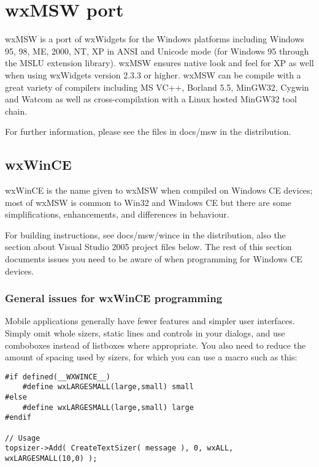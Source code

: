 \section{wxMSW port}\label{wxmswport}

wxMSW is a port of wxWidgets for the Windows platforms
including Windows 95, 98, ME, 2000, NT, XP in ANSI and
Unicode mode (for Windows 95 through the MSLU extension
library). wxMSW ensures native look and feel for XP
as well when using wxWidgets version 2.3.3 or higher.
wxMSW can be compile with a great variety of compilers
including MS VC++, Borland 5.5, MinGW32, Cygwin and
Watcom as well as cross-compilation with a Linux hosted
MinGW32 tool chain.

For further information, please see the files in docs/msw
in the distribution.

\subsection{wxWinCE}\label{wxwince}

wxWinCE is the name given to wxMSW when compiled on Windows CE devices;
most of wxMSW is common to Win32 and Windows CE but there are
some simplifications, enhancements, and differences in
behaviour.

For building instructions, see docs/msw/wince in the
distribution, also the section about Visual Studio 2005 project
files below. The rest of this section documents issues you
need to be aware of when programming for Windows CE devices.

\subsubsection{General issues for wxWinCE programming}

Mobile applications generally have fewer features and
simpler user interfaces. Simply omit whole sizers, static
lines and controls in your dialogs, and use comboboxes instead
of listboxes where appropriate. You also need to reduce
the amount of spacing used by sizers, for which you can
use a macro such as this:

\begin{verbatim}
#if defined(__WXWINCE__)
    #define wxLARGESMALL(large,small) small
#else
    #define wxLARGESMALL(large,small) large
#endif

// Usage
topsizer->Add( CreateTextSizer( message ), 0, wxALL, wxLARGESMALL(10,0) );
\end{verbatim}


